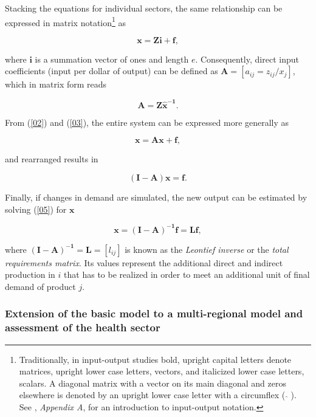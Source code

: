 \documentclass[a4paper,12pt]{article}
\begin{document}
Stacking the equations for individual sectors, the same relationship can be expressed in matrix notation\footnote{Traditionally, in input-output studies bold, upright capital letters denote matrices, upright lower case letters, vectors, and italicized lower case letters, scalars. A diagonal matrix with a vector on its main diagonal and zeros elsewhere is denoted by an upright lower case letter with a circumflex ( $\mathbf{\hat{}}$ ). See \citet{miller2009}, \textit{Appendix A}, for an introduction to input-output notation.} as

\begin{equation}
\mathbf{x = Zi + f}, \label{02} 
\end{equation}

\noindent where $\mathbf{i}$ is a summation vector of ones and length $e$. Consequently, direct input coefficients (input per dollar of output) can be defined as
$\mathbf{A}=[a_{ij} = z_{ij}/x_j]$, which in matrix form reads

\begin{equation} 
\mathbf{A = Z\hat{x}^{-1}}. 
\label{03} 
\end{equation}


From (\ref{02}) and (\ref{03}), the entire system can be expressed more generally as

\begin{equation} 
\mathbf{x = Ax+f}, 
\label{04} 
\end{equation}

\noindent and rearranged results in

\begin{equation} 
\mathbf{(I-A)x = f}. 
\label{05} 
\end{equation}

\noindent Finally, if changes in demand are simulated, the new output can be estimated by solving (\ref{05}) for $\textbf{x}$

\begin{equation} 
\mathbf{x = (I-A)^{-1}f=Lf}, 
\label{06} 
\end{equation}

\noindent where $\mathbf{(I-A)^{-1}=L=}[l_{ij}]$ is known as the \textit{Leontief inverse} or the \textit{total requirements matrix}. Its values represent the additional direct and indirect production in $i$ that has to be realized in order to meet an additional unit of final demand of product $j$.

\subsubsection[Multi-regional model]{Extension of the basic model to a multi-regional model and assessment of the health sector}
\label{sec:mregmod}
\end{document}
